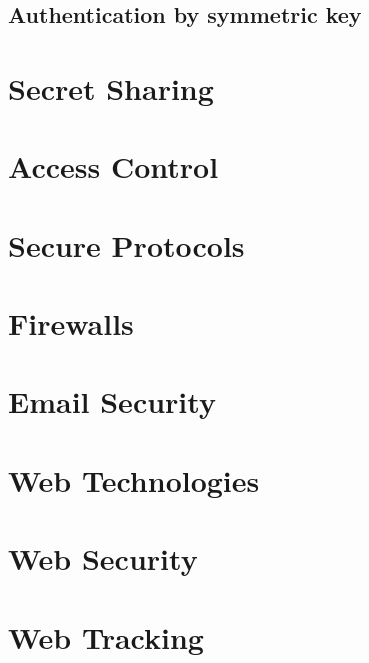 	\subsection{Authentication by symmetric key}
	
	\newpage
	\section{Secret Sharing}

	\newpage
	\section{Access Control}

	\newpage
	\section{Secure Protocols}
	
	\newpage
	\section{Firewalls}

	\newpage
	\section{Email Security}

	\newpage
	\section{Web Technologies}	
	
	\newpage
	\section{Web Security}	
	
	\newpage
	\section{Web Tracking}	
		
